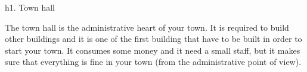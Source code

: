 h1. Town hall

The town hall is the administrative heart of your town. It is required to build other buildings and it is one of the first building that have to be built in order to start your town. It consumes some money and it need a small staff, but it makes sure that everything is fine in your town (from the administrative point of view).